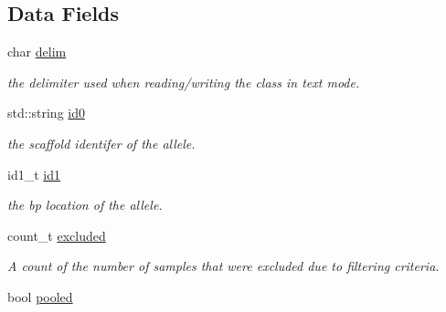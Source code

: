 \subsection*{Data Fields}
\begin{DoxyCompactItemize}
\item 
\hypertarget{classallele__stat_ac7036daf9817b8b2b8701a4c9767be7a}{char \hyperlink{classallele__stat_ac7036daf9817b8b2b8701a4c9767be7a}{delim}}\label{classallele__stat_ac7036daf9817b8b2b8701a4c9767be7a}

\begin{DoxyCompactList}\small\item\em the delimiter used when reading/writing the class in text mode. \end{DoxyCompactList}\item 
\hypertarget{classallele__stat_ae879adda75bd3ba746fe9793e24d4170}{std\-::string \hyperlink{classallele__stat_ae879adda75bd3ba746fe9793e24d4170}{id0}}\label{classallele__stat_ae879adda75bd3ba746fe9793e24d4170}

\begin{DoxyCompactList}\small\item\em the scaffold identifer of the allele. \end{DoxyCompactList}\item 
\hypertarget{classallele__stat_a37b7a57ef288357bd8cee0f4b7afb53b}{id1\-\_\-t \hyperlink{classallele__stat_a37b7a57ef288357bd8cee0f4b7afb53b}{id1}}\label{classallele__stat_a37b7a57ef288357bd8cee0f4b7afb53b}

\begin{DoxyCompactList}\small\item\em the bp location of the allele. \end{DoxyCompactList}\item 
\hypertarget{classallele__stat_a368470e1eb78f3f711d265dc05376a3a}{count\-\_\-t \hyperlink{classallele__stat_a368470e1eb78f3f711d265dc05376a3a}{excluded}}\label{classallele__stat_a368470e1eb78f3f711d265dc05376a3a}

\begin{DoxyCompactList}\small\item\em A count of the number of samples that were excluded due to filtering criteria. \end{DoxyCompactList}\item 
\hypertarget{classallele__stat_aa64930e95321a4957bc4dcd0e19ccb9b}{bool \hyperlink{classallele__stat_aa64930e95321a4957bc4dcd0e19ccb9b}{pooled}}\label{classallele__stat_aa64930e95321a4957bc4dcd0e19ccb9b}


\end{DoxyCompactItemize}
